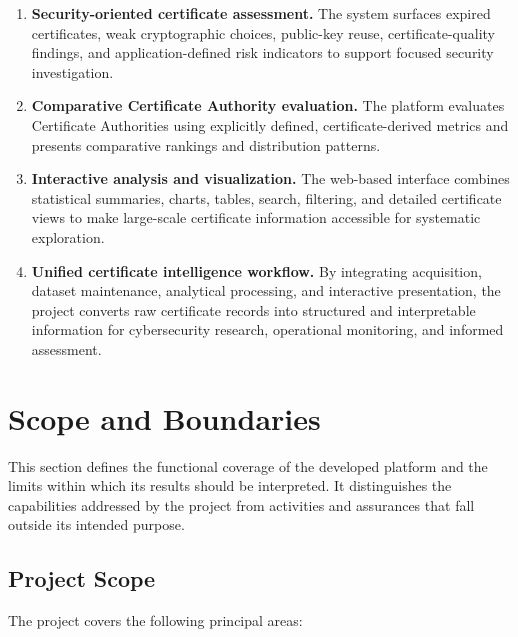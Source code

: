 \begin{enumerate}[label=\arabic*.,leftmargin=0.42in]
  \item \textbf{Security-oriented certificate assessment.} The system surfaces expired certificates, weak cryptographic choices, public-key reuse, certificate-quality findings, and application-defined risk indicators to support focused security investigation.

  \item \textbf{Comparative Certificate Authority evaluation.} The platform evaluates Certificate Authorities using explicitly defined, certificate-derived metrics and presents comparative rankings and distribution patterns.

  \item \textbf{Interactive analysis and visualization.} The web-based interface combines statistical summaries, charts, tables, search, filtering, and detailed certificate views to make large-scale certificate information accessible for systematic exploration.

  \item \textbf{Unified certificate intelligence workflow.} By integrating acquisition, dataset maintenance, analytical processing, and interactive presentation, the project converts raw certificate records into structured and interpretable information for cybersecurity research, operational monitoring, and informed assessment.
\end{enumerate}

\section{Scope and Boundaries}
\label{sec:scope-boundaries}

This section defines the functional coverage of the developed platform and the
limits within which its results should be interpreted. It distinguishes the
capabilities addressed by the project from activities and assurances that fall
outside its intended purpose.

\subsection{Project Scope}

The project covers the following principal areas:

